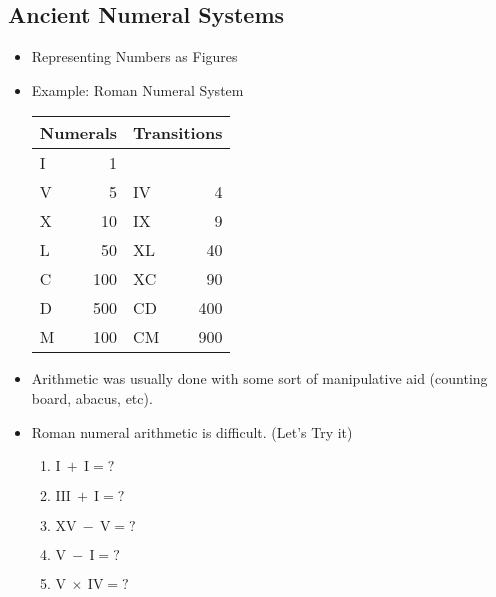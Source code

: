 \documentclass{article}
\begin{document}
\subsection{Ancient Numeral Systems}
\begin{itemize}
    \item Representing Numbers as Figures
    \item Example: Roman Numeral System
    
    \begin{tabular}{|lr|lr|}
    \hline
    \multicolumn{2}{|c|}{Numerals} & \multicolumn{2}{|c|}{Transitions} \\
    \hline
    I & 1 & &\\
    V & 5 & IV & 4\\
    X & 10 & IX & 9\\
    L & 50 & XL & 40 \\
    C & 100 & XC & 90\\
    D & 500 & CD & 400\\ 
    M & 100 & CM & 900\\
    \hline
    \end{tabular}
    \item Arithmetic was usually done with some sort of manipulative aid (counting board, abacus, etc).
    \item Roman numeral arithmetic is difficult. (Let's Try it)
    \begin{enumerate}
        \item $\mathrm{I}\ +\ \mathrm{I}=?$
        \item $\mathrm{III}\ +\ \mathrm{I}=?$
        \item $\mathrm{XV}\ -\ \mathrm{V}=?$
        \item $\mathrm{V}\ -\ \mathrm{I}=?$
        \item $\mathrm{V}\ \times\ \mathrm{IV}=?$
    \end{enumerate}
\end{itemize}
\end{document}
